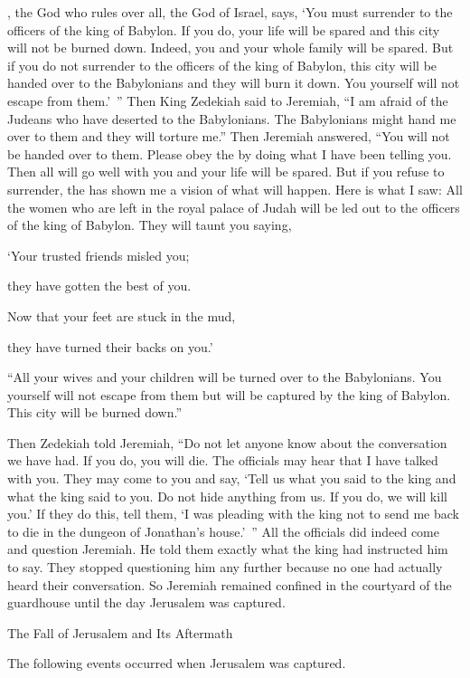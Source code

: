 {{}, the God
who rules over all,
the God
of Israel,
says, ‘You must
surrender
to
the officers
of the king
of Babylon.
If you do, your life
will be spared
and this
city
will not
be burned down.
Indeed, you
and your whole family
will be spared.
But if
you do not
surrender
to
the officers
of the king
of Babylon,
this
city
will be handed
over to the Babylonians
and they will burn
it down.
You
yourself will not
escape
from them.’ ”
Then King
Zedekiah
said to
Jeremiah,
“I am afraid
of the Judeans
who have
deserted
to
the Babylonians.
The Babylonians might
hand
me over to them and they will torture me.”
Then Jeremiah
answered, “You will not
be handed
over to them. Please
obey
the {}
by doing what
I
have been telling
you. Then all will go well
with you and your life
will be spared.
But if
you
refuse
to surrender,
the {}
has shown me a vision of what will happen. Here is
what
I saw:
All
the women
who
are left
in the royal
palace
of Judah
will be led out
to
the officers
of the king
of Babylon.
They
will taunt you saying,
\par }{\Q ‘Your trusted friends
misled
you;
\par }{\Q they have gotten the best
of you.
\par }{\Q Now that your feet
are stuck
in the mud,
\par }{\Q they have turned
their backs on you.’
\par }{\PP {}“All
your wives
and your children
will be turned
over
to
the Babylonians.
You
yourself will not
escape
from them but will be captured
by the king
of Babylon.
This
city
will be burned down.”
\par }{\PP {}Then Zedekiah
told Jeremiah,
“Do
not let anyone
know
about the conversation
we have had. If
you do, you will die.
The officials
may hear
that
I have talked
with
you. They may come
to
you and say,
‘Tell
us
what
you said
to
the king
and what
the king
said
to
you. Do
not hide
anything from
us. If you do, we will kill
you.’
If they do this, tell
them,
‘I
was pleading
with the king
not
to send me back
to die
in the dungeon
of Jonathan’s
house.’ ”
All
the officials
did indeed come
and question
Jeremiah.
He told
them
exactly what
the king
had instructed
him to say. They stopped questioning
him any further because
no
one had actually heard
their conversation.
So
Jeremiah
remained
confined in the courtyard
of the guardhouse
until
the day
Jerusalem
was captured.
\par }{\SH The Fall of Jerusalem and Its Aftermath
\par }{\PP The following events occurred
when Jerusalem
was captured.

}
